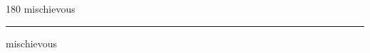 
\begin{frame}
\begin{center}
\begin{turn}{180}
{\fontsize{2.5cm}{1em}\selectfont mischievous}
\end{turn}
\vspace{1em}\par  
\hrule
\vspace{1em}\par  
{\fontsize{2.5cm}{1em}\selectfont mischievous}
\end{center}
\end{frame}
